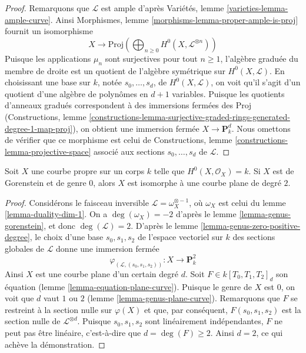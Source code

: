 \begin{proof}
\medskip\noindent
Remarquons que $\mathcal{L}$ est ample d'après Variétés, lemme \ref{varieties-lemma-ample-curve}. Ainsi Morphismes, lemme \ref{morphisms-lemma-proper-ample-is-proj} fournit un isomorphisme $$
X \longrightarrow
\text{Proj}\left(
\bigoplus\nolimits_{n \geq 0} H^0(X, \mathcal{L}^{\otimes n})\right)
$$ Puisque les applications $\mu_n$ sont surjectives pour tout $n \geq 1$, l'algèbre graduée du membre de droite est un quotient de l'algèbre symétrique sur $H^0(X, \mathcal{L})$. En choisissant une base sur $k$, notée $s_0, \ldots, s_d$, de $H^0(X, \mathcal{L})$, on voit qu'il s'agit d'un quotient d'une algèbre de polynômes en $d + 1$ variables. Puisque les quotients d'anneaux gradués correspondent à des immersions fermées des $\text{Proj}$ (Constructions, lemme \ref{constructions-lemma-surjective-graded-rings-generated-degree-1-map-proj}), on obtient une immersion fermée $X \to \mathbf{P}^d_k$. Nous omettons de vérifier que ce morphisme est celui de Constructions, lemme \ref{constructions-lemma-projective-space} associé aux sections $s_0, \ldots, s_d$ de $\mathcal{L}$.
\end{proof}

\begin{lemma}
\label{lemma-genus-zero}
Soit $X$ une courbe propre sur un corps $k$ telle que $H^0(X, \mathcal{O}_X) = k$. Si $X$ est de Gorenstein et de genre $0$, alors $X$ est isomorphe à une courbe plane de degré $2$.
\end{lemma}

\begin{proof}
Considérons le faisceau inversible $\mathcal{L} = \omega_X^{\otimes -1}$, où $\omega_X$ est celui du lemme \ref{lemma-duality-dim-1}. On a $\deg(\omega_X) = -2$ d'après le lemme \ref{lemma-genus-gorenstein}, et donc $\deg(\mathcal{L}) = 2$. D'après le lemme \ref{lemma-genus-zero-positive-degree}, le choix d'une base $s_0, s_1, s_2$ de l'espace vectoriel sur $k$ des sections globales de $\mathcal{L}$ donne une immersion fermée $$
\varphi_{(\mathcal{L}, (s_0, s_1, s_2))} :
X \longrightarrow \mathbf{P}^2_k
$$ Ainsi $X$ est une courbe plane d'un certain degré $d$. Soit $F \in k[T_0, T_1, T_2]_d$ son équation (lemme \ref{lemma-equation-plane-curve}). Puisque le genre de $X$ est $0$, on voit que $d$ vaut $1$ ou $2$ (lemme \ref{lemma-genus-plane-curve}). Remarquons que $F$ se restreint à la section nulle sur $\varphi(X)$ et que, par conséquent, $F(s_0, s_1, s_2)$ est la section nulle de $\mathcal{L}^{\otimes d}$. Puisque $s_0, s_1, s_2$ sont linéairement indépendantes, $F$ ne peut pas être linéaire, c'est-à-dire que $d = \deg(F) \geq 2$. Ainsi $d = 2$, ce qui achève la démonstration.
\end{proof}

